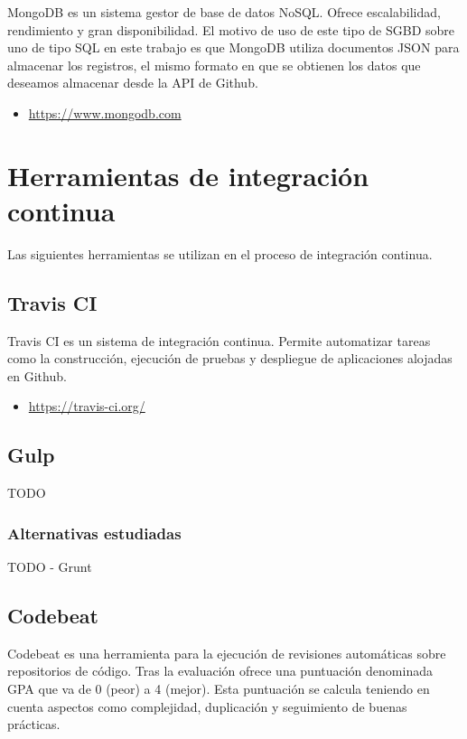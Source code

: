 MongoDB es un sistema gestor de base de datos NoSQL. Ofrece escalabilidad, rendimiento y gran disponibilidad. El motivo de uso de este tipo de SGBD sobre uno de tipo SQL en este trabajo es que MongoDB utiliza documentos JSON para almacenar los registros, el mismo formato en que se obtienen los datos que deseamos almacenar desde la API de Github.

\begin{itemize}
	\item \url{https://www.mongodb.com}
\end{itemize}

\section{Herramientas de integración continua}

Las siguientes herramientas se utilizan en el proceso de integración continua.

\subsection{Travis CI}

Travis CI es un sistema de integración continua. Permite automatizar tareas como la construcción, ejecución de pruebas y despliegue de aplicaciones alojadas en Github.

\begin{itemize}
	\item \url{https://travis-ci.org/}
\end{itemize}

\subsection{Gulp}

TODO

\subsubsection{Alternativas estudiadas}

TODO - Grunt

\subsection{Codebeat}

Codebeat es una herramienta para la ejecución de revisiones automáticas sobre repositorios de código. Tras la evaluación ofrece una puntuación denominada GPA que va de 0 (peor) a 4 (mejor). Esta puntuación se calcula teniendo en cuenta aspectos como complejidad, duplicación y seguimiento de buenas prácticas.

